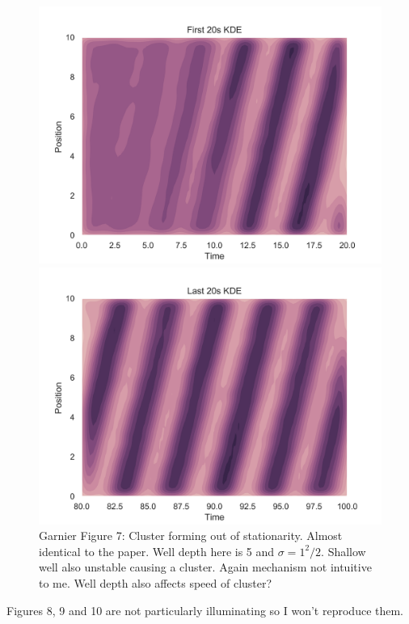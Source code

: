 \documentclass[11pt,a4paper, final, dvipsnames]{article}
\begin{document}
\begin{figure}
    \begin{minipage}[b]{0.49\textwidth}
        \centering
        \includegraphics[width=\textwidth]{GarnierFigure7b}
    \end{minipage} %
    \begin{minipage}[b]{0.49\textwidth}
        \centering                    
        \includegraphics[width=\textwidth]{GarnierFigure7d}
    \end{minipage}
    \caption{Garnier Figure 7: Cluster forming out of stationarity. Almost identical to the paper. Well depth here is 5 and $\sigma = 1^2/2$. Shallow well also unstable causing a cluster. Again mechanism not intuitive to me. Well depth also affects speed of cluster?}
\end{figure}
Figures 8, 9 and 10 are not particularly illuminating so I won't reproduce them.
\end{document}
